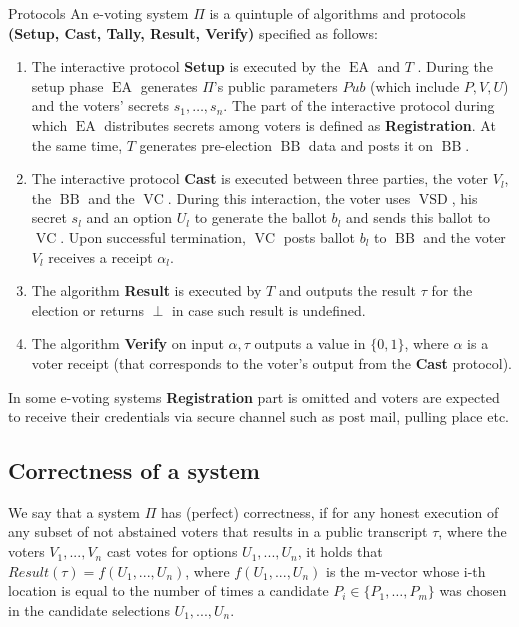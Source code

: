\documentclass[12pt]{article}
\DeclareMathOperator{\vsd}{VSD}
\DeclareMathOperator{\ea}{EA}
\DeclareMathOperator{\bb}{BB}
\DeclareMathOperator{\voc}{VC}
\begin{document}
Protocols
An e-voting system $\Pi$ is a quintuple of algorithms and protocols  \textbf{(Setup, Cast, Tally, Result, Verify)} specified as follows:
\begin{enumerate}
\item The interactive protocol \textbf{Setup} is executed by the $\ea$ and $T$ . During the setup phase $\ea$ generates $\Pi$'s public parameters $Pub$ (which include $P, V, U$) and the voters' secrets $s_1, \dots , s_n$. The part of the interactive protocol during which $\ea$ distributes secrets among voters is defined as \textbf{Registration}. At the same time, $T$ generates pre-election $\bb$ data and posts it on $\bb$.
\item The interactive protocol \textbf{Cast} is executed between three parties, the voter $V_l$, the $\bb$ and the $\voc$. During this interaction, the voter uses $\vsd$, his secret $s_l$ and an option $U_l$ to generate the ballot $b_l$ and sends this ballot to $\voc$. Upon successful termination, $\voc$ posts ballot $b_l$ to $\bb$ and the voter $V_l$ receives a receipt $\alpha_l$.
\item The algorithm \textbf{Result} is executed by $T$ and outputs the result $\tau$ for the election or returns $\perp$ in case such result is undefined.
\item  The algorithm \textbf{Verify} on input $\alpha,\tau$ outputs a value in $\{0,1\}$, where  $\alpha$ is a voter receipt (that corresponds to the voter's output from the \textbf{Cast} protocol).
\end{enumerate}
In some e-voting systems \textbf{Registration} part is omitted and voters are expected to receive their credentials via secure channel such as post mail, pulling place etc.
\subsection{Correctness of a system}
We say that a system $\Pi$ has (perfect) correctness, if for any honest execution of any subset of not abstained voters that results in a public transcript $\tau$, where the voters $V_1, . . . , V_n$ cast votes for options $U_1, . . . , U_n$, it holds that $Result(\tau) = f(U_1,...,U_n)$, where $f(U_1,...,U_n)$ is the m-vector whose i-th location is equal to the number of times a candidate $P_i \in \{P_1,\dots, P_m\}$ was chosen in the candidate selections $U_1, . . . , U_n$.
%
\end{document}
